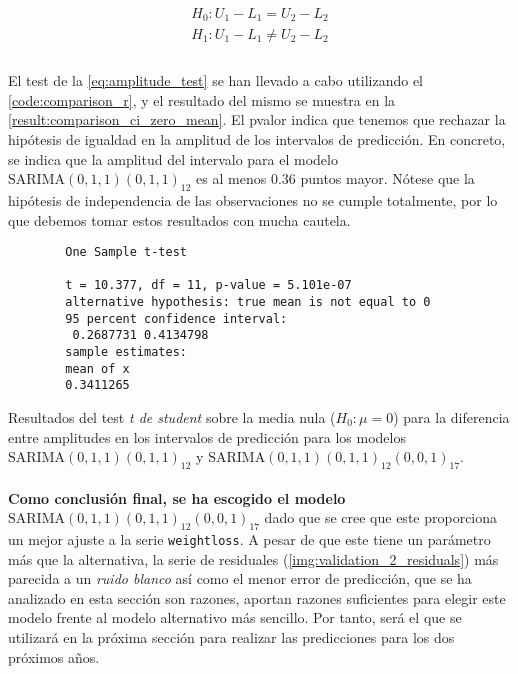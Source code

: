 \documentclass[a4paper, spanish]{article}
\begin{document}
    \begin{equation}
    \label{eq:amplitude_test}
      \begin{split}
        H_0: U_1 - L_1 = U_2 - L_2 \\
        H_1: U_1 - L_1 \neq U_2 - L_2 \\
      \end{split}
    \end{equation}

    \paragraph{}
    El test de la \autoref{eq:amplitude_test} se han llevado a cabo utilizando el \autoref{code:comparison_r}, y el resultado del mismo se muestra en la \autoref{result:comparison_ci_zero_mean}. El pvalor indica que tenemos que rechazar la hipótesis de igualdad en la amplitud de los intervalos de predicción. En concreto, se indica que la amplitud del intervalo para el modelo $\text{SARIMA}(0, 1, 1)(0, 1, 1)_{12}$ es al menos $0.36$ puntos mayor. Nótese que la hipótesis de independencia de las observaciones no se cumple totalmente, por lo que debemos tomar estos resultados con mucha cautela.

    \begin{table}
      \begin{Verbatim}
        One Sample t-test

        t = 10.377, df = 11, p-value = 5.101e-07
        alternative hypothesis: true mean is not equal to 0
        95 percent confidence interval:
         0.2687731 0.4134798
        sample estimates:
        mean of x
        0.3411265
      \end{Verbatim}
      \caption{Resultados del test \emph{t de student} sobre la media nula ($H_0: \mu = 0$) para la diferencia entre amplitudes en los intervalos de predicción para los modelos $\text{SARIMA}(0, 1, 1)(0, 1, 1)_{12}$ y $\text{SARIMA}(0, 1, 1)(0, 1, 1)_{12}(0, 0, 1)_{17}$.}
      \label{result:comparison_ci_zero_mean}
    \end{table}

    \paragraph{}
    \textbf{Como conclusión final, se ha escogido el modelo $\text{SARIMA}(0, 1, 1)(0, 1, 1)_{12}(0, 0, 1)_{17}$} dado que se cree que este proporciona un mejor ajuste a la serie \texttt{weightloss}. A pesar de que este tiene un parámetro más que la alternativa, la serie de residuales (\autoref{img:validation_2_residuals}) más parecida a un \emph{ruido blanco} así como el menor error de predicción, que se ha analizado en esta sección son razones, aportan razones suficientes para elegir este modelo frente al modelo alternativo más sencillo. Por tanto, será el que se utilizará en la próxima sección para realizar las predicciones para los dos próximos años.
\end{document}
